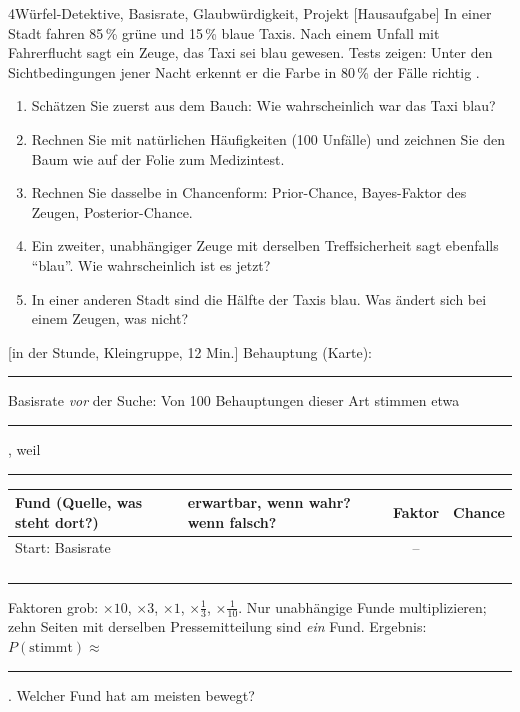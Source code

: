 \begin{uebungsblattb}{4}{Würfel-Detektive, Basisrate, Glaubwürdigkeit, Projekt}
[Hausaufgabe]
In einer Stadt fahren 85\,\% grüne und 15\,\% blaue Taxis. Nach einem
Unfall mit Fahrerflucht sagt ein Zeuge, das Taxi sei blau gewesen. Tests
zeigen: Unter den Sichtbedingungen jener Nacht erkennt er die Farbe in
80\,\% der Fälle richtig \parencite{tversky1982evidential}.
\begin{enumerate}
  \item Schätzen Sie zuerst aus dem Bauch: Wie wahrscheinlich war das
    Taxi blau?
  \item Rechnen Sie mit natürlichen Häufigkeiten (100 Unfälle) und
    zeichnen Sie den Baum wie auf der Folie zum Medizintest.
  \item Rechnen Sie dasselbe in Chancenform: Prior-Chance, Bayes-Faktor
    des Zeugen, Posterior-Chance.
  \item Ein zweiter, unabhängiger Zeuge mit derselben Treffsicherheit sagt
    ebenfalls \enquote{blau}. Wie wahrscheinlich ist es jetzt?
  \item In einer anderen Stadt sind die Hälfte der Taxis blau. Was ändert
    sich bei einem Zeugen, was nicht?
\end{enumerate}

[in der Stunde, Kleingruppe, 12 Min.]
Behauptung (Karte): \rule{0.7\textwidth}{0.3pt}

Basisrate \emph{vor} der Suche: Von 100 Behauptungen dieser Art stimmen
etwa \rule{12mm}{0.3pt}, weil\\ \rule{\textwidth}{0.3pt}

\begin{center}
\small
\renewcommand{\arraystretch}{1.7}
\begin{tabular}{|p{}|p{}|c|c|}
\hline
\textbf{Fund} (Quelle, was steht dort?) & \textbf{erwartbar, wenn wahr? wenn falsch?} & \textbf{Faktor} & \textbf{Chance} \\ \hline
Start: Basisrate & & -- & \hspace{12mm} \\ \hline
 & & & \\ \hline
 & & & \\ \hline
 & & & \\ \hline
 & & & \\ \hline
\end{tabular}
\end{center}
Faktoren grob: $\times10$, $\times3$, $\times1$, $\times\tfrac13$,
$\times\tfrac1{10}$. Nur unabhängige Funde multiplizieren; zehn Seiten mit
derselben Pressemitteilung sind \emph{ein} Fund.
Ergebnis: $P(\text{stimmt})\approx$ \rule{15mm}{0.3pt}. Welcher Fund hat
am meisten bewegt?


\end{uebungsblattb}
